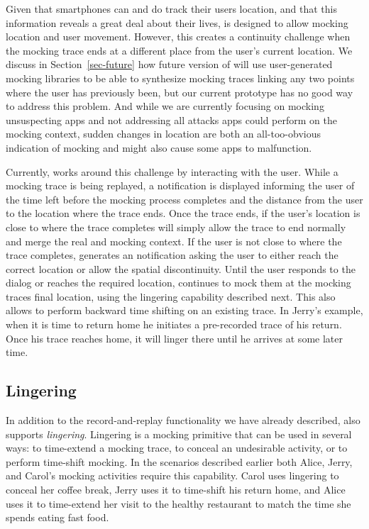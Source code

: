 Given that smartphones can and do track their users location, and that this
information reveals a great deal about their lives, \PocketMocker{} is
designed to allow mocking location and user movement. However, this creates a
continuity challenge when the mocking trace ends at a different place from
the user's current location. We discuss in Section~\ref{sec-future} how
future version of \PocketMocker{} will use user-generated mocking libraries
to be able to synthesize mocking traces linking any two points where the user
has previously been, but our current prototype has no good way to address
this problem. And while we are currently focusing on mocking unsuspecting
apps and not addressing all attacks apps could perform on the mocking
context, sudden changes in location are both an all-too-obvious indication of
mocking and might also cause some apps to malfunction.

Currently, \PocketMocker{} works around this challenge by interacting with the
user. While a mocking trace is being replayed, a notification is displayed
informing the user of the time left before the mocking process completes and
the distance from the user to the location where the trace ends. Once the
trace ends, if the user's location is close to where the trace completes
\PocketMocker{} will simply allow the trace to end normally and merge the
real and mocking context. If the user is not close to where the trace
completes, \PocketMocker{} generates an notification asking the user to
either reach the correct location or allow the spatial discontinuity. Until
the user responds to the dialog or reaches the required location,
\PocketMocker{} continues to mock them at the mocking traces final location,
using the lingering capability described next. This also allows
\PocketMocker{} to perform backward time shifting on an existing trace. In
Jerry's example, when it is time to return home he initiates a pre-recorded
trace of his return. Once his trace reaches home, it will linger there until
he arrives at some later time.

\subsection{Lingering}

In addition to the record-and-replay functionality we have already described,
\PocketMocker{} also supports \textit{lingering}. Lingering is a mocking
primitive that can be used in several ways: to time-extend a mocking trace,
to conceal an undesirable activity, or to perform time-shift mocking. In the
scenarios described earlier both Alice, Jerry, and Carol's mocking activities
require this capability. Carol uses lingering to conceal her coffee break,
Jerry uses it to time-shift his return home, and Alice uses it to time-extend
her visit to the healthy restaurant to match the time she spends eating fast
food.

